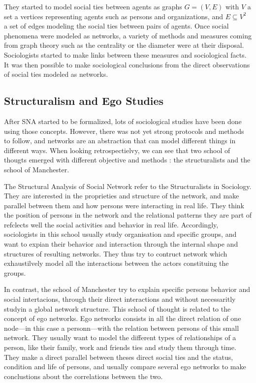 They started to model social ties between agents as graphs $G = (V, E)$ with $V$ a set a vertices representing agents such as persons and organizations, and $E \subseteq V^2$ a set of edges modeling the social ties between pairs of agents.
Once social phenomena were modeled as networks, a variety of methods and measures coming from graph theory such as the centrality or the diameter were at their disposal. Sociologists started to make links between these measures and sociological facts. It was then possible to make sociological conclusions from the direct observations of social ties modeled as networks.



\subsection{Structuralism and Ego Studies}

After SNA started to be formalized, lots of sociological studies have been done using those concepts. However, there was not yet strong protocols and methods to follow, and networks are an abstraction that can model different things in different ways. When looking retrospectielvy, we can see that two school of thougts emerged with different objective and methods : the structuralists and the school of Manchester.

The Structural Analysis of Social Network refer to the Structuralists in Sociology. They are interested in the proprieties and structure of the network, and make parallel between them and how persons were interacting in real life. They think the position of persons in the network and the relational patterns they are part of refclects well the  social activities and behavior in real life. Accordingly, sociologists in this school usually study organisation and specific groups, and want to expian their behavior and interaction through the internal shape and structures of resulting networks. They thus try to contruct network which exhaustilvely model all the interactions between the actors constituing the groups.

In contrast, the school of Manchester try to explain specific persons behavior and social intertacions, through their direct interactions and without necessaritly studyin a global network structure. This school of thought is related to the concept of ego networks. Ego networks consists in all the direct relation of one node---in this case a personn---with the relation between persons of this small network. They usually want to model the different types of relationships of a person, like their family, work and friends ties and study them through time. They make a direct parallel between theses direct social ties and the status, condition and life of persons, and usually compare several ego networks to make conclustions about the correlations between the two.

